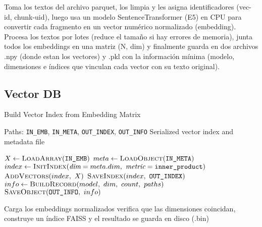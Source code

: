 Toma los textos del archivo parquet, los limpia y les asigna identificadores (vec-id, chunk-uid), luego usa un modelo SentenceTransformer (E5) en CPU para convertir cada fragmento en un vector numérico normalizado (embedding).
Procesa los textos por lotes (reduce el tamaño si hay errores de memoria), junta todos los embeddings en una matriz (N, dim) y finalmente guarda en dos archivos .npy (donde estan los vectores) y .pkl con la información mínima (modelo, dimensiones e índices que vinculan cada vector con su texto original).

\subsection{Vector DB}\label{subsec:vector-db}
\begin{algorithmEN}[H]
  \caption{Build Vector Index from Embedding Matrix}
  \begin{algorithmic}[1]
    \Require Paths: \texttt{IN\_EMB}, \texttt{IN\_META}, \texttt{OUT\_INDEX}, \texttt{OUT\_INFO}
    \Ensure Serialized vector index and metadata file

    \State $X \gets \textsc{LoadArray}(\texttt{IN\_EMB})$ 
    \State $meta \gets \textsc{LoadObject}(\texttt{IN\_META})$ 
    \State $index \gets \textsc{InitIndex}(\textit{dim}=meta.dim,\ \textit{metric}=\texttt{inner\_product})$
    \State $\textsc{AddVectors}(index,\ X)$
    \State $\textsc{SaveIndex}(index,\ \texttt{OUT\_INDEX})$
    \State $info \gets \textsc{BuildRecord}(model,\ dim,\ count,\ paths)$
    \State $\textsc{SaveObject}(\texttt{OUT\_INFO},\ info)$
  \end{algorithmic}
  \label{alg:build_vector_index}
\end{algorithmEN}

Carga los embeddings normalizados verifica que las dimensiones coincidan, construye un índice FAISS y  el resultado se guarda en disco (.bin)

